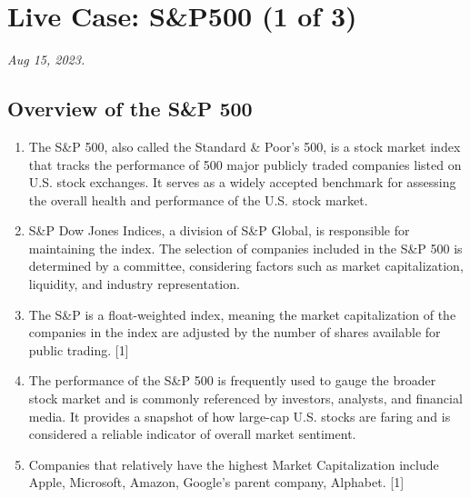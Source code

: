 \documentclass[
  letterpaper,
  DIV=11,
  numbers=noendperiod]{scrreport}
\author{}
\date{}
\begin{document}
\ifdefined\Shaded\renewenvironment{Shaded}{\begin{tcolorbox}[boxrule=0pt, breakable, enhanced, sharp corners, borderline west={3pt}{0pt}{shadecolor}, interior hidden, frame hidden]}{\end{tcolorbox}}\fi

\hypertarget{live-case-sp500-1-of-3}{%
\chapter{Live Case: S\&P500 (1 of 3)}\label{live-case-sp500-1-of-3}}

\emph{Aug 15, 2023.}

\hypertarget{overview-of-the-sp-500}{%
\section{Overview of the S\&P 500}\label{overview-of-the-sp-500}}

\begin{enumerate}
\def\labelenumi{\arabic{enumi}.}
\item
  The S\&P 500, also called the Standard \& Poor's 500, is a stock
  market index that tracks the performance of 500 major publicly traded
  companies listed on U.S. stock exchanges. It serves as a widely
  accepted benchmark for assessing the overall health and performance of
  the U.S. stock market.
\item
  S\&P Dow Jones Indices, a division of S\&P Global, is responsible for
  maintaining the index. The selection of companies included in the S\&P
  500 is determined by a committee, considering factors such as market
  capitalization, liquidity, and industry representation.
\item
  The S\&P is a float-weighted index, meaning the market capitalization
  of the companies in the index are adjusted by the number of shares
  available for public trading. {[}1{]}
\item
  The performance of the S\&P 500 is frequently used to gauge the
  broader stock market and is commonly referenced by investors,
  analysts, and financial media. It provides a snapshot of how large-cap
  U.S. stocks are faring and is considered a reliable indicator of
  overall market sentiment.
\item
  Companies that relatively have the highest Market Capitalization
  include Apple, Microsoft, Amazon, Google's parent company, Alphabet.
  {[}1{]}
\end{enumerate}
\end{document}
